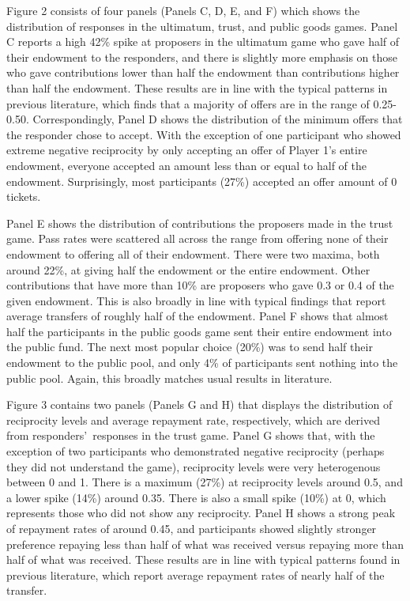 \documentclass[12pt]{article}
\begin{document}
Figure 2 consists of four panels (Panels C, D, E, and F) which shows the distribution of responses in the ultimatum, trust, and public goods games. Panel C reports a high 42\% spike at proposers in the ultimatum game who gave half of their endowment to the responders, and there is slightly more emphasis on those who gave contributions lower than half the endowment than contributions higher than half the endowment. These results are in line with the typical patterns in previous literature, which finds that a majority of offers are in the range of 0.25-0.50. Correspondingly, Panel D shows the distribution of the minimum offers that the responder chose to accept. With the exception of one participant who showed extreme negative reciprocity by only accepting an offer of Player 1's entire endowment, everyone accepted an amount less than or equal to half of the endowment. Surprisingly, most participants (27\%) accepted an offer amount of 0 tickets. 

Panel E shows the distribution of contributions the proposers made in the trust game. Pass rates were scattered all across the range from offering none of their endowment to offering all of their endowment. There were two maxima, both around 22\%, at giving half the endowment or the entire endowment. Other contributions that have more than 10\% are proposers who gave 0.3 or 0.4 of the given endowment. This is also broadly in line with typical findings that report average transfers of roughly half of the endowment. Panel F shows that almost half the participants in the public goods game sent their entire endowment into the public fund. The next most popular choice (20\%) was to send half their endowment to the public pool, and only 4\% of participants sent nothing into the public pool. Again, this broadly matches usual results in literature.

Figure 3 contains two panels (Panels G and H) that displays the distribution of reciprocity levels and average repayment rate, respectively, which are derived from responders\rq \ responses in the trust game. Panel G shows that, with the exception of two participants who demonstrated negative reciprocity (perhaps they did not understand the game), reciprocity levels were very heterogenous between 0 and 1. There is a maximum (27\%) at reciprocity levels around 0.5, and a lower spike (14\%) around 0.35. There is also a small spike (10\%) at 0, which represents those who did not show any reciprocity. Panel H shows a strong peak of repayment rates of around 0.45, and participants showed slightly stronger preference repaying less than half of what was received versus repaying more than half of what was received. These results are in line with typical patterns found in previous literature, which report average repayment rates of nearly half of the transfer.
\end{document}
